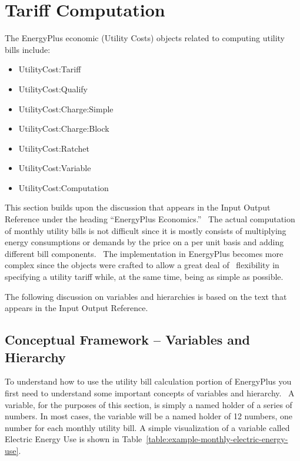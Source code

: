 \section{Tariff Computation}\label{tariff-computation}

The EnergyPlus economic (Utility Costs) objects related to computing utility bills include:

\begin{itemize}
\item
  UtilityCost:Tariff
\item
  UtilityCost:Qualify
\item
  UtilityCost:Charge:Simple
\item
  UtilityCost:Charge:Block
\item
  UtilityCost:Ratchet
\item
  UtilityCost:Variable
\item
  UtilityCost:Computation
\end{itemize}

This section builds upon the discussion that appears in the Input Output Reference under the heading ``EnergyPlus Economics.''~ The actual computation of monthly utility bills is not difficult since it is mostly consists of multiplying energy consumptions or demands by the price on a per unit basis and adding different bill components.~ The implementation in EnergyPlus becomes more complex since the objects were crafted to allow a great deal of~ flexibility in specifying a utility tariff while, at the same time, being as simple as possible.

The following discussion on variables and hierarchies is based on the text that appears in the Input Output Reference.

\subsection{Conceptual Framework -- Variables and Hierarchy}\label{conceptual-framework-variables-and-hierarchy}

To understand how to use the utility bill calculation portion of EnergyPlus you first need to understand some important concepts of variables and hierarchy.~ A variable, for the purposes of this section, is simply a named holder of a series of numbers. In most cases, the variable will be a named holder of 12 numbers, one number for each monthly utility bill. A simple visualization of a variable called Electric Energy Use is shown in Table~\ref{table:example-monthly-electric-energy-use}.

